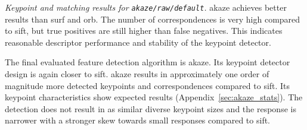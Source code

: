 \begin{table}[H]
    {\renewcommand{\arraystretch}{1.2}%
    \setlength{\tabcolsep}{0.6em}%
    \footnotesize

    }
    \caption[Keypoint and matching results for \texttt{\acrshort{akaze}/raw/default}]{\emph{Keypoint and matching results for \texttt{\acrshort{akaze}/raw/default}.} \acrshort{akaze} achieves better results than \acrshort{surf} and \acrshort{orb}. The number of correspondences is very high compared to \acrshort{sift}, but true positives are still higher than false negatives. This indicates reasonable descriptor performance and stability of the keypoint detector.}
\end{table}
The final evaluated feature detection algorithm is \acrshort{akaze}.
Its keypoint detector design is again closer to \acrshort{sift}.
\acrshort{akaze} results in approximately one order of magnitude more detected keypoints and correspondences compared to \acrshort{sift}.
Its keypoint characteristics show expected results (Appendix~\ref{sec:akaze_stats}).
The detection does not result in as similar diverse keypoint sizes and the response is narrower with a stronger skew towards small responses compared to \acrshort{sift}.
